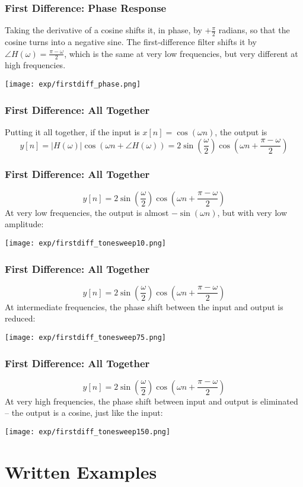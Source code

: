 \documentclass{beamer}
\begin{document}
\begin{frame}
  \frametitle{First Difference: Phase Response}

  Taking the derivative of a cosine shifts it, in phase, by
  $+\frac{\pi}{2}$ radians, so that the cosine turns into a negative
  sine.  The first-difference filter shifts it by $\angle
  H(\omega)=\frac{\pi-\omega}{2}$, which is the same at very low frequencies,
  but very different at high frequencies.
  \centerline{\texttt{[image: exp/firstdiff\_phase.png]}}
\end{frame}

\begin{frame}
  \frametitle{First Difference: All Together}
  Putting it all together, if the input is $x[n]=\cos(\omega n)$, the output is
  \[
  y[n]=|H(\omega)|\cos\left(\omega n+\angle H(\omega)\right)
  =2\sin\left(\frac{\omega}{2}\right)\cos\left(\omega n+\frac{\pi-\omega}{2}\right)
  \]
\end{frame}

\begin{frame}
  \frametitle{First Difference: All Together}
  \[
  y[n]=2\sin\left(\frac{\omega}{2}\right)\cos\left(\omega n+\frac{\pi-\omega}{2}\right)
  \]
  At very low frequencies, the output is almost $-\sin(\omega n)$, but
  with very low amplitude:
  \centerline{\texttt{[image: exp/firstdiff\_tonesweep10.png]}}
\end{frame}


\begin{frame}
  \frametitle{First Difference: All Together}
  \[
  y[n]=2\sin\left(\frac{\omega}{2}\right)\cos\left(\omega n+\frac{\pi-\omega}{2}\right)
  \]
  At intermediate frequencies, the phase shift between the input and output is reduced:
  \centerline{\texttt{[image: exp/firstdiff\_tonesweep75.png]}}
\end{frame}

\begin{frame}
  \frametitle{First Difference: All Together}
  \[
  y[n]=2\sin\left(\frac{\omega}{2}\right)\cos\left(\omega n+\frac{\pi-\omega}{2}\right)
  \]
  At very high frequencies, the phase shift between input and output
  is eliminated -- the output is a cosine, just like the input:
  \centerline{\texttt{[image: exp/firstdiff\_tonesweep150.png]}}
\end{frame}


\section[Example]{Written Examples}
\setcounter{subsection}{1}
\end{document}
